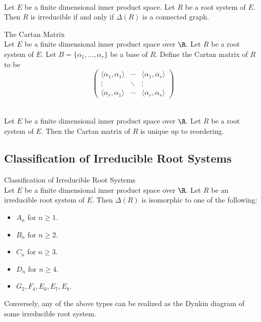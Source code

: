 \documentclass[a4paper]{article}
\begin{document}
\begin{prp}{}{} \\Let $E$ be a finite dimensional inner product space. Let $R$ be a root system of $E$. Then $R$ is irreducible if and only if $\Delta(R)$ is a connected graph. 
\end{prp}

\begin{defn}{The Cartan Matrix}{} \\Let $E$ be a finite dimensional inner product space over $\R$. Let $R$ be a root system of $E$. Let $B=\{\alpha_1,\dots,\alpha_r\}$ be a base of $R$. Define the Cartan matrix of $R$ to be $$\begin{pmatrix}
\langle\alpha_1,\alpha_1\rangle & \cdots & \langle\alpha_1,\alpha_r\rangle\\
\vdots & \ddots & \vdots\\
\langle\alpha_r,\alpha_1\rangle & \cdots & \langle\alpha_r,\alpha_r\rangle
\end{pmatrix}$$
\end{defn}

\begin{prp}{}{} \\Let $E$ be a finite dimensional inner product space over $\R$. Let $R$ be a root system of $E$. Then the Cartan matrix of $R$ is unique up to reordering. 
\end{prp}

\subsection{Classification of Irreducible Root Systems}
\begin{thm}{Classification of Irreducible Root Systems}{} \\Let $E$ be a finite dimensional inner product space over $\R$. Let $R$ be an irreducible root system of $E$. Then $\Delta(R)$ is isomorphic to one of the following: 
\begin{itemize}
\item $A_n$ for $n\geq 1$. 
\item $B_n$ for $n\geq 2$. 
\item $C_n$ for $n\geq 3$. 
\item $D_n$ for $n\geq 4$. 
\item $G_2,F_4,E_6,E_7,E_8$. 
\end{itemize}
Conversely, any of the above types can be realized as the Dynkin diagram of some irreducible root system. 
\end{thm}
\end{document}
